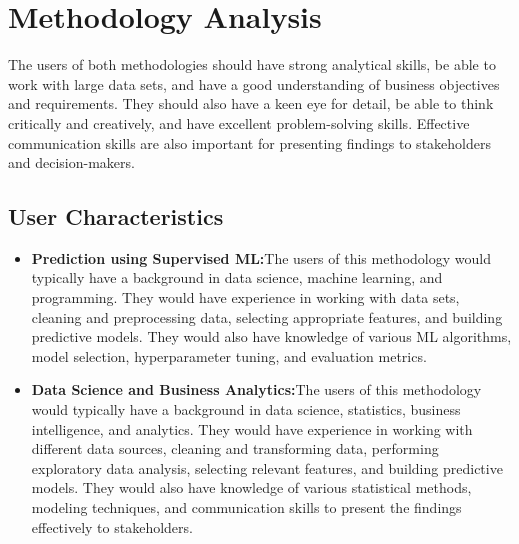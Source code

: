 \chapter{Methodology Analysis}
\justify
\quad 
 The users of both methodologies should have strong analytical skills, be able to work with large data sets, and have a good understanding of business objectives and requirements. They should also have a keen eye for detail, be able to think critically and creatively, and have excellent problem-solving skills. Effective communication skills are also important for presenting findings to stakeholders and decision-makers.

\section{User Characteristics}
\justify
\quad
\begin{itemize}
    \item \textbf{Prediction using Supervised ML:}The users of this methodology would typically have a background in data science, machine learning, and programming. They would have experience in working with data sets, cleaning and preprocessing data, selecting appropriate features, and building predictive models. They would also have knowledge of various ML algorithms, model selection, hyperparameter tuning, and evaluation metrics.
    \item \textbf{Data Science and Business Analytics:}The users of this methodology would typically have a background in data science, statistics, business intelligence, and analytics. They would have experience in working with different data sources, cleaning and transforming data, performing exploratory data analysis, selecting relevant features, and building predictive models. They would also have knowledge of various statistical methods, modeling techniques, and communication skills to present the findings effectively to stakeholders.
  
\end{itemize}

